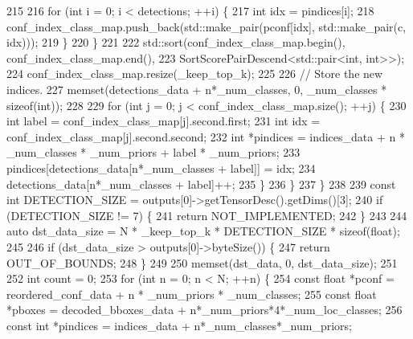 \begin{DoxyCode}
215 
216                     \textcolor{keywordflow}{for} (\textcolor{keywordtype}{int} i = 0; i < detections; ++i) \{
217                         \textcolor{keywordtype}{int} idx = pindices[i];
218                         conf\_index\_class\_map.push\_back(std::make\_pair(pconf[idx], std::make\_pair(c, idx)));
219                     \}
220                 \}
221 
222                 std::sort(conf\_index\_class\_map.begin(), conf\_index\_class\_map.end(),
223                           SortScorePairDescend<std::pair<int, int>>);
224                 conf\_index\_class\_map.resize(\_keep\_top\_k);
225 
226                 \textcolor{comment}{// Store the new indices.}
227                 memset(detections\_data + n*\_num\_classes, 0, \_num\_classes * \textcolor{keyword}{sizeof}(\textcolor{keywordtype}{int}));
228 
229                 \textcolor{keywordflow}{for} (\textcolor{keywordtype}{int} j = 0; j < conf\_index\_class\_map.size(); ++j) \{
230                     \textcolor{keywordtype}{int} label = conf\_index\_class\_map[j].second.first;
231                     \textcolor{keywordtype}{int} idx = conf\_index\_class\_map[j].second.second;
232                     \textcolor{keywordtype}{int} *pindices = indices\_data + n * \_num\_classes * \_num\_priors + label * \_num\_priors;
233                     pindices[detections\_data[n*\_num\_classes + label]] = idx;
234                     detections\_data[n*\_num\_classes + label]++;
235                 \}
236             \}
237         \}
238 
239         \textcolor{keyword}{const} \textcolor{keywordtype}{int} DETECTION\_SIZE = outputs[0]->getTensorDesc().getDims()[3];
240         \textcolor{keywordflow}{if} (DETECTION\_SIZE != 7) \{
241             \textcolor{keywordflow}{return} NOT\_IMPLEMENTED;
242         \}
243 
244         \textcolor{keyword}{auto} dst\_data\_size = N * \_keep\_top\_k * DETECTION\_SIZE * \textcolor{keyword}{sizeof}(float);
245 
246         \textcolor{keywordflow}{if} (dst\_data\_size > outputs[0]->byteSize()) \{
247             \textcolor{keywordflow}{return} OUT\_OF\_BOUNDS;
248         \}
249 
250         memset(dst\_data, 0, dst\_data\_size);
251 
252         \textcolor{keywordtype}{int} count = 0;
253         \textcolor{keywordflow}{for} (\textcolor{keywordtype}{int} n = 0; n < N; ++n) \{
254             \textcolor{keyword}{const} \textcolor{keywordtype}{float} *pconf   = reordered\_conf\_data + n * \_num\_priors * \_num\_classes;
255             \textcolor{keyword}{const} \textcolor{keywordtype}{float} *pboxes  = decoded\_bboxes\_data + n*\_num\_priors*4*\_num\_loc\_classes;
256             \textcolor{keyword}{const} \textcolor{keywordtype}{int} *pindices  = indices\_data + n*\_num\_classes*\_num\_priors;

\end{DoxyCode}
